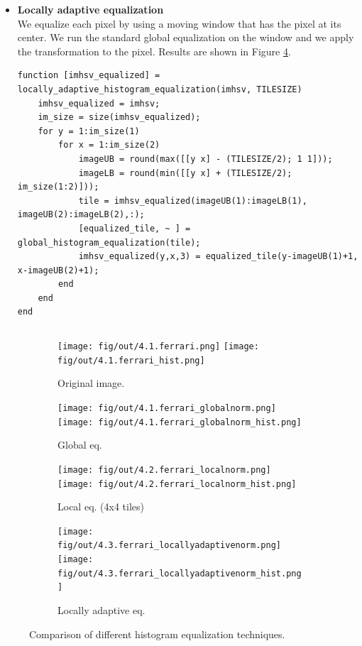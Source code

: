 \documentclass[tikz,14pt,fleqn]{article}
\begin{document}
\begin{itemize}
    \item \textbf{Locally adaptive equalization}\\
    We equalize each pixel by using a moving window that has the pixel at its center. We run the standard global equalization on the window and we apply the transformation to the pixel. Results are shown in Figure \ref{fig:4.3.ferrari_adaptivenorm}.
    \begin{verbatim} 
function [imhsv_equalized] = locally_adaptive_histogram_equalization(imhsv, TILESIZE)
    imhsv_equalized = imhsv;
    im_size = size(imhsv_equalized);
    for y = 1:im_size(1)
        for x = 1:im_size(2)
            imageUB = round(max([[y x] - (TILESIZE/2); 1 1]));
            imageLB = round(min([[y x] + (TILESIZE/2); im_size(1:2)]));
            tile = imhsv_equalized(imageUB(1):imageLB(1), imageUB(2):imageLB(2),:);
            [equalized_tile, ~ ] = global_histogram_equalization(tile);
            imhsv_equalized(y,x,3) = equalized_tile(y-imageUB(1)+1, x-imageUB(2)+1);
        end
    end
end
    \end{verbatim}
\begin{verbatim} 

\end{verbatim}
\end{itemize}
\begin{figure}[h!]
    \begin{subfigure}{0.24\textwidth}
        \centering
        \texttt{[image: fig/out/4.1.ferrari.png]}
        \texttt{[image: fig/out/4.1.ferrari\_hist.png]}
        \caption{Original image.}
    \end{subfigure}
    \begin{subfigure}{0.24\textwidth}
        \centering
        \texttt{[image: fig/out/4.1.ferrari\_globalnorm.png]}
        \texttt{[image: fig/out/4.1.ferrari\_globalnorm\_hist.png]}
        \caption{Global eq.}
        \label{fig:4.1.ferrari_globalnorm}
    \end{subfigure}
    \begin{subfigure}{0.24\textwidth}
        \centering
        \texttt{[image: fig/out/4.2.ferrari\_localnorm.png]}
        \texttt{[image: fig/out/4.2.ferrari\_localnorm\_hist.png]}
        \caption{Local eq. (4x4 tiles)}
        \label{fig:4.2.ferrari_localnorm}
    \end{subfigure}
    \begin{subfigure}{0.24\textwidth}
        \centering
        \texttt{[image: fig/out/4.3.ferrari\_locallyadaptivenorm.png]}
        \texttt{[image: fig/out/4.3.ferrari\_locallyadaptivenorm\_hist.png]}
        \caption{Locally adaptive eq.}
        \label{fig:4.3.ferrari_adaptivenorm}
    \end{subfigure}

    \caption{Comparison of different histogram equalization techniques.}
\end{figure}
\end{document}
